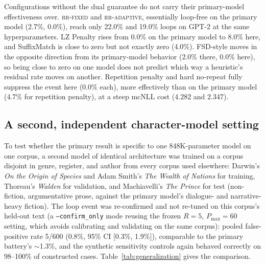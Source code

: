 \documentclass[make,article,submit,pdftex]{Definitions/mdpi}
\begin{document}
Configurations without the dual guarantee do not carry their primary-model effectiveness over. \textsc{rr-fixed} and \textsc{rr-adaptive}, essentially loop-free on the primary model (2.7\%, 0.0\%), reach only 22.0\% and 19.0\% loops on GPT-2 at the same hyperparameters. LZ Penalty rises from 0.0\% on the primary model to 8.0\% here, and SuffixMatch is close to zero but not exactly zero (4.0\%). FSD-style moves in the opposite direction from its primary-model behavior (2.0\% there, 0.0\% here), so being close to zero on one model does not predict which way a heuristic's residual rate moves on another. Repetition penalty and hard no-repeat fully suppress the event here (0.0\% each), more effectively than on the primary model (4.7\% for repetition penalty), at a steep mcNLL cost (4.282 and 2.347).

\subsection{A second, independent character-model setting}
To test whether the primary result is specific to one 848K-parameter model on one corpus, a second model of identical architecture was trained on a corpus disjoint in genre, register, and author from every corpus used elsewhere: Darwin's \emph{On the Origin of Species} and Adam Smith's \emph{The Wealth of Nations} for training, Thoreau's \emph{Walden} for validation, and Machiavelli's \emph{The Prince} for test (non-fiction, argumentative prose, against the primary model's dialogue- and narrative-heavy fiction). The loop event was re-confirmed and not re-tuned on this corpus's held-out text (a \texttt{--confirm\_\allowbreak{}only} mode reusing the frozen $R{=}5$, $P_{\max}{=}60$ setting, which avoids calibrating and validating on the same corpus): pooled false-positive rate 5/600 (0.8\%, 95\% CI [0.3\%, 1.9\%]), comparable to the primary battery's $\sim$1.3\%, and the synthetic sensitivity controls again behaved correctly on 98--100\% of constructed cases. Table~\ref{tab:generalization} gives the comparison.
\end{document}

